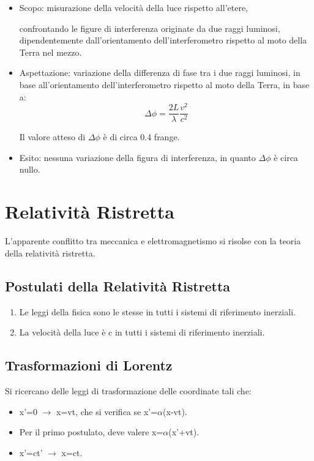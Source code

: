 \documentclass{article}
\begin{document}
\begin{itemize}
    \item Scopo: misurazione della velocità della luce rispetto all'etere,

          confrontando le figure di interferenza originate da due raggi luminosi, dipendentemente dall'orientamento dell'interferometro rispetto al moto della Terra nel mezzo.

    \item Aspettazione: variazione della differenza di fase tra i due raggi luminosi, in base all'orientamento dell'interferometro rispetto al moto della Terra, in base a:
          \begin{equation}
              \Delta \phi = \frac{2L}{\lambda} \frac{v^2}{c^2}
          \end{equation}

          Il valore atteso di $\Delta \phi$ è di circa 0.4 frange.

    \item Esito: nessuna variazione della figura di interferenza, in quanto $\Delta \phi$ è circa nullo.
\end{itemize}


\section{Relatività Ristretta}
L'apparente conflitto tra meccanica e elettromagnetismo si risolse con la teoria della relatività ristretta.

\subsection{Postulati della Relatività Ristretta}

\begin{enumerate}
    \item Le leggi della fisica sono le stesse in tutti i sistemi di riferimento inerziali.
    \item La velocità della luce è c in tutti i sistemi di riferimento inerziali.
\end{enumerate}

\subsection{Trasformazioni di Lorentz}
Si ricercano delle leggi di trasformazione delle coordinate tali che:
\begin{itemize}
    \item x'=0 $\rightarrow$ x=vt, che si verifica se x'=$\alpha$(x-vt).
    \item Per il primo postulato, deve valere x=$\alpha$(x'+vt).
    \item x'=ct' $\rightarrow$ x=ct.
\end{itemize}
\end{document}
